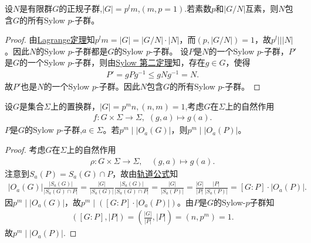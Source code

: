 \documentclass[../../main.tex]{subfiles}%
\begin{document}
\begin{example}
设$N$是有限群$G$的正规子群,$|G|=p^lm$,$(m,p=1)$.若素数$p$和$|G/N|$互素，则$N$包含$G$的所有Sylow $p$-子群。
\end{example}
\begin{proof}

由\hyperref[theorem:抽象代数--Lagrange定理]{Lagrange定理}知$p^lm=|G|=|G/N|\cdot|N|$，而$(p,|G/N|)=1$，故$p^l || |N|$。因此$N$的Sylow $p$-子群都是$G$的Sylow $p$-子群。
设$P$是$N$的一个Sylow $p$-子群，$P'$是$G$的一个Sylow $p$-子群，则由\hyperref[theorem:Sylow 第二定理]{Sylow 第二定理}知，存在$g\in G$，使得
\begin{align*}
P' = gPg^{-1} \leqslant gNg^{-1} = N.
\end{align*}
故$P'$也是$N$的一个Sylow $p$-子群。因此$N$包含$G$的所有Sylow $p$-子群。

\end{proof}

\begin{example}
设$G$是集合$\Sigma$上的置换群，$|G|=p^mn,(n,m)=1$,考虑$G$在$\Sigma$上的自然作用
\begin{align*}
f:G\times \Sigma \to \Sigma,\,\,(g,a)\mapsto g(a).
\end{align*}
$P$是$G$的Sylow $p$-子群,$a\in\Sigma$。若$p^m\mid |O_a(G)|$，则$p^m\mid |O_a(P)|$。
\end{example}
\begin{proof}

考虑$G$在$\Sigma$上的自然作用
\begin{align*}
\rho: G\times \Sigma \rightarrow \Sigma ,\quad (g,a) \mapsto g(a).
\end{align*}
注意到$S_a(P)=S_a(G)\cap P$，故由\hyperref[corollary:有限群轨道的阶与其商掉迷向子群的阶相同]{轨道公式}知
\begin{align*}
|O_a(G)|\frac{|S_a(G)|}{|S_a(G)\cap P|}=\frac{|G|}{|S_a(G)|}\frac{|S_a(G)|}{|S_a(G)\cap P|}=\frac{|G|}{|S_a(P)|}=\frac{|G|}{|P|}\frac{|P|}{|S_a(P)|}=[G:P]\cdot |O_a(P)|.
\end{align*}
因$p^m\mid |O_a(G)|$，故$p^m\mid ([G:P]\cdot |O_a(P)|)$。由$P$是$G$的Sylow-$p$子群知
\begin{align*}
([G:P],|P|)=\left(\frac{|G|}{|P|},|P|\right)=(n,p^m)=1.
\end{align*}
故$p^m\mid |O_a(P)|$.

\end{proof}
\end{document}
